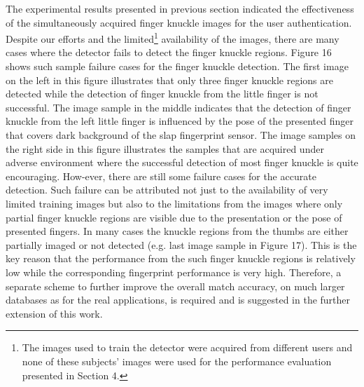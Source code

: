 The experimental results presented in previous section indicated the effectiveness of the simultaneously acquired finger knuckle images for the user authentication. Despite our efforts and the limited\footnote[2]{The images used to train the detector were acquired from different users and none of these subjects’ images were used for the performance evaluation presented in Section 4.}  availability of the images, there are many cases where the detector fails to detect the finger knuckle regions. Figure 16 shows such sample failure cases for the finger knuckle detection. The first image on the left in this figure illustrates that only three finger knuckle regions are detected while the detection of finger knuckle from the little finger is not successful. The image sample in the middle indicates that the detection of finger knuckle from the left little finger is influenced by the pose of the presented finger that covers dark background of the slap fingerprint sensor. The image samples on the right side in this figure illustrates the samples that are acquired under adverse environment where the successful detection of most finger knuckle is quite encouraging. How-ever, there are still some failure cases for the accurate detection. Such failure can be attributed not just to the availability of very limited training images but also to the limitations from the images where only partial finger knuckle regions are visible due to the presentation or the pose of presented fingers.  In many cases the knuckle regions from the thumbs are either partially imaged or not detected (e.g. last image sample in Figure 17). This is the key reason that the performance from the such finger knuckle regions is relatively low while the corresponding fingerprint performance is very high. Therefore, a separate scheme to further improve the overall match accuracy, on much larger databases as for the real applications, is required and is suggested in the further extension of this work.  

